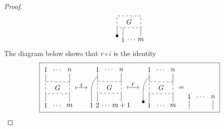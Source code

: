 \documentclass{amsart}
\theoremstyle{definition}
\begin{document}
\begin{proof}
\begin{equation*}
{\begin{tikzpicture}[scale=.6]
			\draw [dashed] (0,0) rectangle (2,1); \node at (1, .5) {$G$};
			
			\node at(0,-.7) {$\bullet$}; \draw (0,-.7) -- (0,0);
			\node at (.5,-1) {$1$}; \draw (.5,-.7) -- (.5,0);
			\node at (1.25,-1) {$\dots$};
			\node at (2,-1) {$m$}; \draw (2,-.7) -- (2,0);
			\end{tikzpicture}}
		\end{equation*}
		The diagram below shows that $r\circ i$ is the identity
		\begin{equation*}
		\boxed{\begin{tikzpicture}[scale=.6]
			\node at (0,2) {$1$}; \draw (0,1.7) -- (0,1);
			\node at (1,2) {$\dots$};
			\node at (2,2) {$n$}; \draw (2,1.7) -- (2,.9);
			
			\draw [dashed] (0,0) rectangle (2,1); \node at (1, .5) {$G$};
			
			\node at (0,-1) {$1$}; \draw (0,-.7) -- (0,0);
			\node at (1,-1) {$\dots$};
			\node at (2,-1) {$m$}; \draw (2,-.7) -- (2,0);
			
			\node at (3,.75) {$i$}; \draw [|->] (2.5,.5) -- (3.5,.5);
			\end{tikzpicture}
			\begin{tikzpicture}[scale=.6]
			\node at (0,2) {$1$}; \draw (0,1.7) -- (0,1);
			\node at (1,2) {$\dots$};
			\node at (2,2) {$n$}; \draw (2,1.7) -- (2,.9);
			
			\draw [dashed] (0,0) rectangle (2,1); \node at (1, .5) {$G$};
			
			\node at (-.5,-1) {$1$}; \draw (-.5,-.7)  to[out=90,in=-140]  (0,1.4);
			\node at (0,-1) {$2$}; \draw (0,-.7) -- (0,0);
			\node at (.75,-1) {$\dots$};
			\node at (2,-1) {$m+1$}; \draw (2,-.7) -- (2,0);
			
			\node at (3,.75) {$r$}; \draw [|->] (2.5,.5) -- (3.5,.5);
			\end{tikzpicture}
			\begin{tikzpicture}[scale=.6]
			\node at (0,2) {$1$}; \draw (0,1.7) -- (0,1);
			\node at (1,2) {$\dots$};
			\node at (2,2) {$n$}; \draw (2,1.7) -- (2,.9);
			
			\draw [dashed] (0,0) rectangle (2,1); \node at (1, .5) {$G$};
			
			\node at (-.5,-.7) {$\bullet$}; \draw (-.5,-.7)  to[out=90,in=-140]  (0,1.4);
			\node at (0,-1) {$1$}; \draw (0,-.7) -- (0,0);
			\node at (1,-1) {$\dots$};
			\node at (2,-1) {$m$}; \draw (2,-.7) -- (2,0);
			\node at (2.7,.5) {$=$}; 
			\end{tikzpicture}
			\! %
			\begin{tikzpicture}[scale=.6]
			\node at (0,2) {$1$}; \draw (0,1.7) -- (0,1);
			\node at (1,2) {$\dots$};
			\node at (2,2) {$n$}; \draw (2,1.7) -- (2,.9);
			

\end{tikzpicture}}
\end{equation*}
\end{proof}
\end{document}

